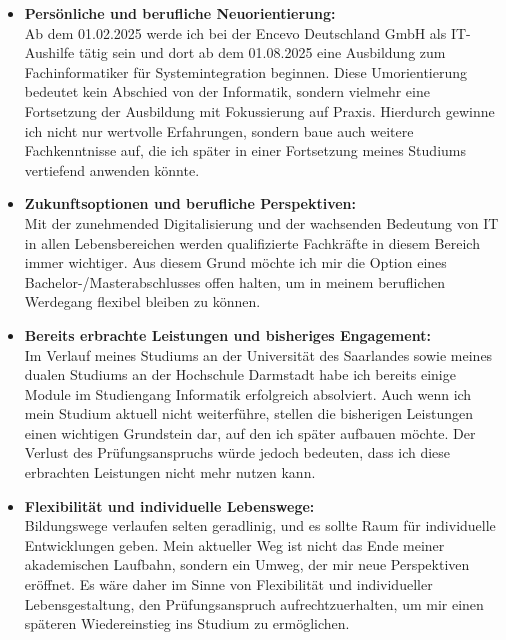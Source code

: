 \documentclass[a4paper,12pt]{article}
\begin{document}
\begin{itemize}[label={-}, labelwidth=2em, left=1em]
\item \textbf{Persönliche und berufliche Neuorientierung:}\\
Ab dem 01.02.2025 werde ich bei der Encevo Deutschland GmbH als IT-Aushilfe tätig sein und dort ab dem 01.08.2025 eine Ausbildung zum Fachinformatiker für Systemintegration beginnen.
Diese Umorientierung bedeutet kein Abschied von der Informatik, sondern vielmehr eine Fortsetzung der Ausbildung mit Fokussierung auf Praxis.
Hierdurch gewinne ich nicht nur wertvolle Erfahrungen, sondern baue auch weitere Fachkenntnisse auf, die ich später in einer Fortsetzung meines Studiums vertiefend anwenden könnte.

\item \textbf{Zukunftsoptionen und berufliche Perspektiven:}\\
Mit der zunehmended Digitalisierung und der wachsenden Bedeutung von IT in allen Lebensbereichen werden qualifizierte Fachkräfte in diesem Bereich immer wichtiger.
Aus diesem Grund möchte ich mir die Option eines Bachelor-/Masterabschlusses offen halten, um in meinem beruflichen Werdegang flexibel bleiben zu können.

\item \textbf{Bereits erbrachte Leistungen und bisheriges Engagement:}\\
Im Verlauf meines Studiums an der Universität des Saarlandes sowie meines dualen Studiums an der Hochschule Darmstadt habe ich bereits einige Module im Studiengang Informatik erfolgreich absolviert.
Auch wenn ich mein Studium aktuell nicht weiterführe, stellen die bisherigen Leistungen einen wichtigen Grundstein dar, auf den ich später aufbauen möchte.
Der Verlust des Prüfungsanspruchs würde jedoch bedeuten, dass ich diese erbrachten Leistungen nicht mehr nutzen kann.

\item \textbf{Flexibilität und individuelle Lebenswege:}\\
Bildungswege verlaufen selten geradlinig, und es sollte Raum für individuelle Entwicklungen geben.
Mein aktueller Weg ist nicht das Ende meiner akademischen Laufbahn, sondern ein Umweg, der mir neue Perspektiven eröffnet.
Es wäre daher im Sinne von Flexibilität und individueller Lebensgestaltung, den Prüfungsanspruch aufrechtzuerhalten, um mir einen späteren Wiedereinstieg ins Studium zu ermöglichen.


\end{itemize}
\end{document}
